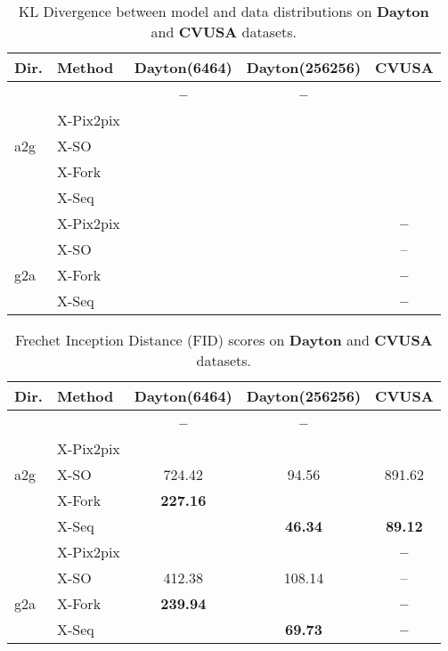 \documentclass[times,twocolumn,final,authoryear]{elsarticle_modified}
\begin{document}
\begin{table}[t]
 \small
  \centering
\renewcommand{\tabcolsep}{.2mm}  
  
  \caption{\small KL Divergence between model and data distributions on {\bf Dayton} and {\bf CVUSA} datasets.}
  \vspace{-10pt}
  \label{tab:model_data_KL}
    \begin{tabular}{llccc}
        \toprule
       \textbf{Dir.} & \textbf{Method} & \textbf{Dayton(6464)} & \textbf{Dayton(256256)} & \textbf{CVUSA}\\
        \midrule
        & \cite{zhai2017crossview} & \textbf{--} & \textbf{--} & \\
        & X-Pix2pix &  &  &   \\
    a2g & X-SO &    &  &   \\  
 & X-Fork &    &  &  
\\
    & X-Seq &  &  & \\
    \midrule 
    & X-Pix2pix &  &  &   \textbf{--} \\
         & X-SO &   &  &   --\\  

    g2a & X-Fork &    &  & \textbf{--}
\\
    & X-Seq &  &  & \textbf{--}\\
        \bottomrule


    \end{tabular}
\end{table}





\begin{table}[t]
 \small
  \centering
  \renewcommand{\arraystretch}{.6}
  \renewcommand{\tabcolsep}{.45mm}  
  
  \caption{\small Frechet Inception Distance (FID) scores on {\bf Dayton} and {\bf CVUSA} datasets.}
  \vspace{-10pt}
  \label{tab:fid}
    \begin{tabular}{llccc}
        \toprule
       \textbf{Dir.} & \textbf{Method} & \textbf{Dayton(6464)} & \textbf{Dayton(256256)} & \textbf{CVUSA}\\
        \midrule
        & \cite{zhai2017crossview} & \textbf{--} & \textbf{--} & \\
        & X-Pix2pix &  &  &   \\
    a2g & X-SO &  724.42  & 94.56 & 891.62   \\  
 & X-Fork &   \textbf{227.16} &  &  
\\
    & X-Seq &  & \textbf{46.34} & \textbf{89.12} \\
    \midrule 
    & X-Pix2pix &  &  &   \textbf{--} \\
         & X-SO & 412.38 & 108.14 &   --\\  

    g2a & X-Fork &   \textbf{239.94} &  & \textbf{--}
\\
    & X-Seq &  & \textbf{69.73} & \textbf{--}\\
        \bottomrule


    \end{tabular}
\end{table}
\end{document}
